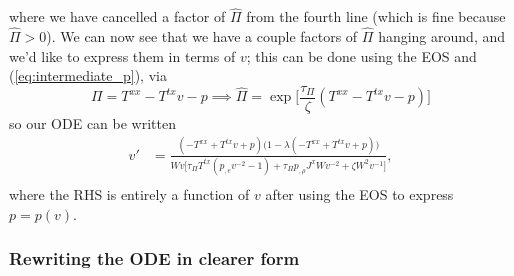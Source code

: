 \documentclass[12pt]{article}
\numberwithin{equation}{section}
\begin{document}
where we have cancelled a factor of $\hat{\Pi}$ from the fourth line (which is fine because $\hat{\Pi} > 0$).
We can now see that we have a couple factors of $\hat{\Pi}$ hanging around, and we'd like to express them in terms of $v$; this can be done using the EOS and (\ref{eq:intermediate_p}), via
\begin{equation}
\Pi = T^{xx} - T^{tx} v - p \implies \hat{\Pi} = \exp\Big[ \frac{\tau_{\Pi}}{\zeta} (T^{xx} - T^{tx} v - p) \Big]
\end{equation}
so our ODE can be written
\begin{equation}
\begin{aligned}
v' &= \frac{(-T^{xx} + T^{tx} v + p) \Big( 1 - \lambda (-T^{xx} + T^{tx} v + p) \Big)}{W v \Big[ \tau_{\Pi} T^{tx} ( p_{,e} v^{-2} - 1) + \tau_{\Pi} p_{,\rho} J^x W v^{-2} + \zeta W^2 v^{-1} \Big]}, \\
\end{aligned}
\end{equation}
where the RHS is entirely a function of $v$ after using the EOS to express $p = p(v)$.

\subsubsection{Rewriting the ODE in clearer form}
\end{document}
